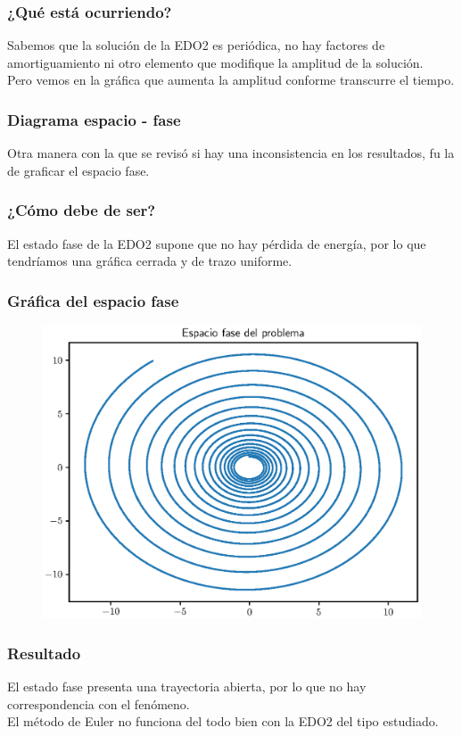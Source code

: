 \documentclass[12pt]{beamer}
\begin{document}
\begin{frame}
\frametitle{¿Qué está ocurriendo?}
Sabemos que la solución de la EDO2 es periódica, no hay factores de amortiguamiento ni otro elemento que modifique la amplitud de la solución.
\\
\bigskip
\pause
Pero vemos en la gráfica que aumenta la amplitud conforme transcurre el tiempo.
\end{frame}
\begin{frame}
\frametitle{Diagrama espacio - fase}
Otra manera con la que se revisó si hay una inconsistencia en los resultados, fu la de graficar el espacio fase.
\end{frame}
\begin{frame}
\frametitle{¿Cómo debe de ser?}
El estado fase de la EDO2 supone que no hay pérdida de energía, por lo que tendríamos una gráfica cerrada y de trazo uniforme.
\end{frame}
\begin{frame}
\frametitle{Gráfica del espacio fase}
\begin{figure}
	\centering
	\includegraphics[scale=0.55]{Imagenes/plot_euler_ejercicio_05.eps}
\end{figure}
\end{frame}
\begin{frame}
\frametitle{Resultado}
El estado fase presenta una trayectoria abierta, por lo que no hay correspondencia con el fenómeno.
\\
\bigskip
\pause
El método de Euler no funciona del todo bien con la EDO2 del tipo estudiado.
\end{frame}
\end{document}
